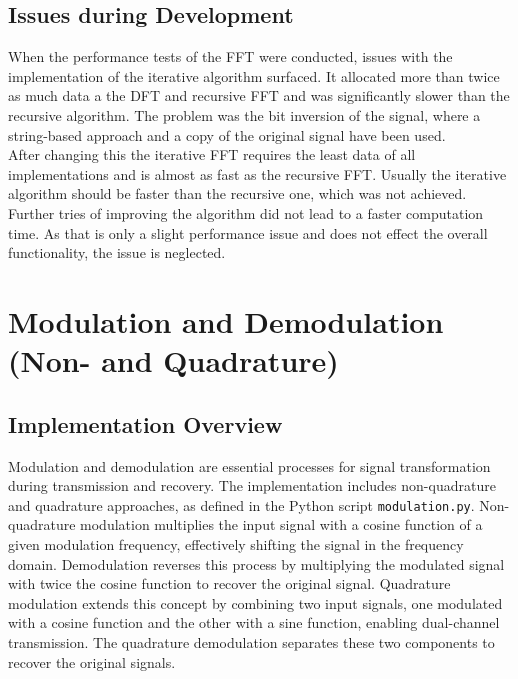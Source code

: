 \documentclass[12pt, a4paper]{report}
\begin{document}
\subsection{Issues during Development}
When the performance tests of the \ac{FFT} were conducted, issues with the implementation of the iterative algorithm surfaced. It allocated more than twice as much data a the \ac{DFT} and recursive \ac{FFT} and was significantly slower than the recursive algorithm. The problem was the bit inversion of the signal, where a string-based approach and a copy of the original signal have been used.\\
After changing this the iterative \ac{FFT} requires the least data of all implementations and is almost as fast as the recursive \ac{FFT}.
Usually the iterative algorithm should be faster than the recursive one, which was not achieved.\\
Further tries of improving the algorithm did not lead to a faster computation time.
As that is only a slight performance issue and does not effect the overall functionality, the issue is neglected.

\section{Modulation and Demodulation (Non- and Quadrature)}

\subsection{Implementation Overview}
Modulation and demodulation are essential processes for signal transformation during transmission and recovery. The implementation includes non-quadrature and quadrature approaches, as defined in the Python script \texttt{modulation.py}. Non-quadrature modulation multiplies the input signal with a cosine function of a given modulation frequency, effectively shifting the signal in the frequency domain. Demodulation reverses this process by multiplying the modulated signal with twice the cosine function to recover the original signal. Quadrature modulation extends this concept by combining two input signals, one modulated with a cosine function and the other with a sine function, enabling dual-channel transmission. The quadrature demodulation separates these two components to recover the original signals.
\end{document}
